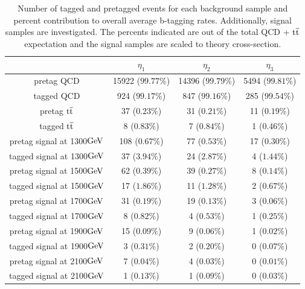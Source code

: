 \begin{table}
\begin{center}
\begin{tabular}{|c||c|c|c|} 
\hline
  & $\eta_1$ & $\eta_2$ & $\eta_3$ \\
\hline
\hline
pretag QCD & 15922 ($99.77\%$) & 14396 ($99.79\%$) & 5494 ($99.81\%$)\\
tagged QCD & 924 ($99.17\%$) & 847 ($99.16\%$) & 285 ($99.54\%$)\\
pretag $\mathrm{t\overline{t}}$ & 37 ($0.23\%$) & 31 ($0.21\%$) & 11 ($0.19\%$)\\
tagged $\mathrm{t\overline{t}}$ & 8 ($0.83\%$) & 7 ($0.84\%$) & 1 ($0.46\%$)\\
pretag signal at 1300$\mathrm{GeV}$ & 108 ($0.67\%$) & 77 ($0.53\%$) & 17 ($0.30\%$)\\
tagged signal at 1300$\mathrm{GeV}$ & 37 ($3.94\%$) & 24 ($2.87\%$) & 4 ($1.44\%$)\\
pretag signal at 1500$\mathrm{GeV}$ & 62 ($0.39\%$) & 39 ($0.27\%$) & 8 ($0.14\%$)\\
tagged signal at 1500$\mathrm{GeV}$ & 17 ($1.86\%$) & 11 ($1.28\%$) & 2 ($0.67\%$)\\
pretag signal at 1700$\mathrm{GeV}$ & 31 ($0.19\%$) & 19 ($0.13\%$) & 3 ($0.06\%$)\\
tagged signal at 1700$\mathrm{GeV}$ & 8 ($0.82\%$) & 4 ($0.53\%$) & 1 ($0.25\%$)\\
pretag signal at 1900$\mathrm{GeV}$ & 15 ($0.09\%$) & 9 ($0.06\%$) & 1 ($0.02\%$)\\
tagged signal at 1900$\mathrm{GeV}$ & 3 ($0.31\%$) & 2 ($0.20\%$) & 0 ($0.07\%$)\\
pretag signal at 2100$\mathrm{GeV}$ & 7 ($0.04\%$) & 4 ($0.03\%$) & 0 ($0.01\%$)\\
tagged signal at 2100$\mathrm{GeV}$ & 1 ($0.13\%$) & 1 ($0.09\%$) & 0 ($0.03\%$)\\
\hline
\end{tabular}
\end{center}
\caption{Number of tagged and pretagged events for each background sample and percent contribution to overall average b-tagging rates.  Additionally, signal samples are investigated.  
The percents indicated are out of the total QCD + $\mathrm{t\overline{t}}$ expectation and the signal samples are scaled to theory cross-section.}
\label{table:singletop}
\end{table}

